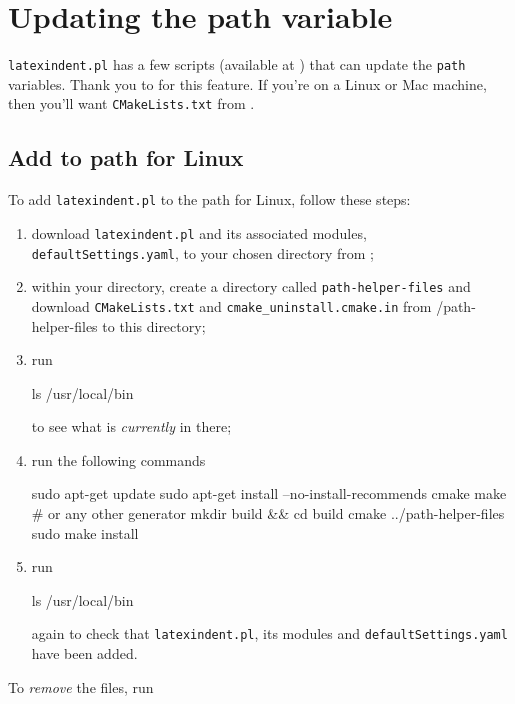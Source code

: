 \documentclass[10pt]{article}
\begin{document}
 \section{Updating the path variable}\label{sec:updating-path}
  \texttt{latexindent.pl} has a few scripts (available at \cite{latexindent-home}) that can
  update the \texttt{path} variables. Thank you to \cite{jasjuang} for this feature. If
  you're on a Linux or Mac machine, then you'll want \texttt{CMakeLists.txt} from
  \cite{latexindent-home}.
 \subsection{Add to path for Linux}
  To add \texttt{latexindent.pl} to the path for Linux, follow these steps:
  \begin{enumerate}
   \item download \texttt{latexindent.pl} and its associated modules,
         \texttt{defaultSettings.yaml}, to your chosen directory from
         \cite{latexindent-home} ;
   \item within your directory, create a directory called \texttt{path-helper-files} and
         download \texttt{CMakeLists.txt} and \lstinline!cmake_uninstall.cmake.in! from
         \cite{latexindent-home}/path-helper-files to this directory;
   \item run

         \begin{commandshell}
ls /usr/local/bin
\end{commandshell}

         to see what is \emph{currently} in there;
   \item run the following commands

         \begin{commandshell}
sudo apt-get update
sudo apt-get install --no-install-recommends cmake make # or any other generator
mkdir build && cd build
cmake ../path-helper-files
sudo make install
\end{commandshell}

   \item run

         \begin{commandshell}
ls /usr/local/bin
\end{commandshell}

         again to check that \texttt{latexindent.pl}, its modules and
         \texttt{defaultSettings.yaml} have been added.
  \end{enumerate}
  To \emph{remove} the files, run
\end{document}
